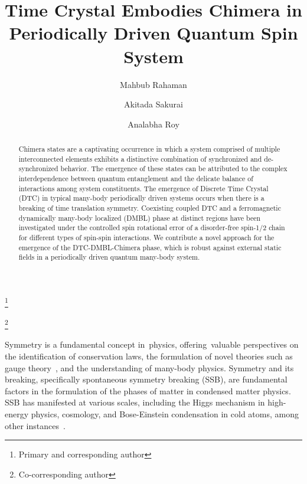 \documentclass[%
nofootinbib,
reprint,
superscriptaddress,
amsmath,amssymb,showkeys,
aps,
prb,
]{revtex4-2}
\begin{document}
	
	\title{Time Crystal Embodies Chimera in Periodically Driven Quantum Spin System}
	
	\author{Mahbub Rahaman}
	\thanks{Primary and corresponding author}
	\author{Akitada Sakurai}
	\author{Analabha Roy}
	\thanks{Co-corresponding author}
	
	\begin{abstract}
		Chimera states are a captivating occurrence in which a system comprised of multiple interconnected elements exhibits a distinctive combination of synchronized and de-synchronized behavior. The emergence of these states can be attributed to the complex interdependence between quantum entanglement and the delicate balance of interactions among system constituents. The emergence of Discrete Time Crystal (DTC) in typical many-body periodically driven systems occurs when there is a breaking of time translation symmetry. Coexisting coupled DTC and a ferromagnetic dynamically many-body localized (DMBL) phase at distinct regions have been investigated under the controlled spin rotational error of a disorder-free spin-1/2 chain for different types of spin-spin interactions. We contribute a novel approach for the emergence of the DTC-DMBL-Chimera phase, which is robust against external static fields in a periodically driven quantum many-body system.
	\end{abstract}
	
	\maketitle
	
	Symmetry is a fundamental concept in physics, offering valuable perspectives on the identification of conservation laws, the formulation of novel theories such as gauge theory~\cite{Yang_1954}, and the understanding of many-body physics. Symmetry and its breaking, specifically spontaneous symmetry breaking (SSB), are fundamental factors in the formulation of the phases of matter in condensed matter physics. SSB has manifested at various scales, including the Higgs mechanism in high-energy physics, cosmology, and  Bose-Einstein condensation  in cold atoms, among other instances~\cite{krasnov_spontaneous_2012, sadler_spontaneous_2006, vanderbruggen_spontaneous_2015}.
\end{document}
